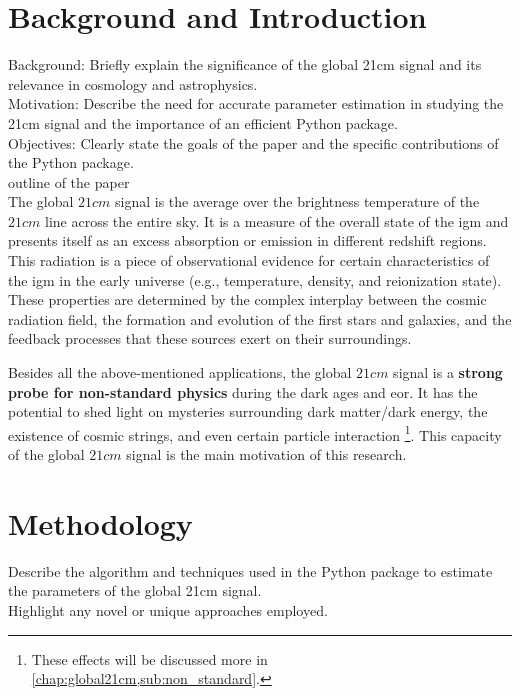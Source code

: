 \documentclass[%
 reprint,
 amsmath,amssymb,
 aps,
]{revtex4-2}
\begin{document}
\maketitle


\section{Background and Introduction}
Background: Briefly explain the significance of the global 21cm signal and its relevance in cosmology and astrophysics.\\
Motivation: Describe the need for accurate parameter estimation in studying the 21cm signal and the importance of an efficient Python package.\\
Objectives: Clearly state the goals of the paper and the specific contributions of the Python package.\\
outline of the paper\\
The global $21cm$ signal is the average over the brightness temperature of the $21cm$ line across the entire sky. It is a measure of the overall state of the \gls{igm} and presents itself as an excess absorption or emission in different redshift regions. This radiation is a piece of observational evidence for certain characteristics of the \gls{igm} in the early universe (e.g., temperature, density, and reionization state). These properties are determined by the complex interplay between the cosmic radiation field, the formation and evolution of the first stars and galaxies, and the feedback processes that these sources exert on their surroundings\cite{21century}.\par
Besides all the above-mentioned applications, the global $21cm$ signal is a \textbf{strong probe for non-standard physics} during the dark ages and \gls{eor}. It has the potential to shed light on mysteries surrounding dark matter/dark energy, the existence of cosmic strings, and even certain particle interaction  \cite{dark_nature_21, constrain_dm_21, cosmic_string_brandenberger, ee_interaction_21, neutrino_21} \footnote{These effects will be discussed more in \ref{chap:global21cm,sub:non_standard}.}. This capacity of the global $21cm$ signal is the main motivation of this research.


\section{Methodology}
Describe the algorithm and techniques used in the Python package to estimate the parameters of the global 21cm signal.\\
Highlight any novel or unique approaches employed.
\end{document}
